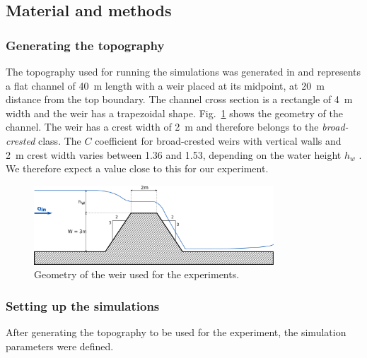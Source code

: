 \subsection{Material and methods}
\subsubsection{Generating the topography}
The topography used for running the simulations was generated in  and represents a flat channel of \SI{40}{\meter} length with a weir placed at its midpoint, at \SI{20}{\meter} distance from the top boundary.
The channel cross section is a rectangle of \SI{4}{\meter} width and the weir has a trapezoidal shape.
Fig.~\ref{fig:weir_scheme} shows the geometry of the channel.
The weir has a crest width of \SI{2}{\meter} and therefore belongs to the \emph{broad-crested} class. The $C$ coefficient for broad-crested weirs with vertical walls and \SI{2}{\meter} crest width varies between \num{1.36} and \num{1.53}, depending on the water height $h_w$ \autocite{brown_urban_2009}.
We therefore expect a value close to this for our experiment.

\begin{figure}[h]
  \centering
  \includegraphics[width=0.8\textwidth]{Figures/weir_scheme.png}
  \caption{Geometry of the weir used for the experiments.}
  \label{fig:weir_scheme}
\end{figure}

\subsubsection{Setting up the simulations}
After generating the topography to be used for the experiment, the simulation parameters were defined.

